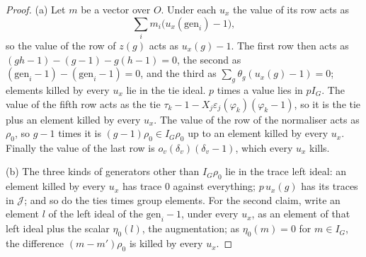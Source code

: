 \begin{proof}
(a) Let $m$ be a vector over $O$. Under each $u_x$ the value of its row acts as
\[
  \textstyle\sum_im_i\bigl(u_x(\mathrm{gen}_i)-1\bigr),
\]
so the value of the row of $z(g)$ acts as $u_x(g)-1$. The first row then acts as $(gh-1)-(g-1)-g(h-1)=0$, the second as
$(\mathrm{gen}_i-1)-(\mathrm{gen}_i-1)=0$, and the third as $\sum_g\theta_g(u_x(g)-1)=0$; elements killed by every $u_x$ lie in the tie ideal. $p$ times a value lies in $pI_G$. The value of the fifth row acts as the tie
$\tau_k-1-X_j\varepsilon_j(\varphi_k)(\varphi_k-1)$, so it is the tie plus an element killed by every $u_x$. The value of the row of the normaliser acts as $\rho_0$, so $g-1$ times it is $(g-1)\rho_0\in I_G\rho_0$ up to an element killed by every
$u_x$. Finally the value of the last row is $o_v(\delta_v)(\delta_v-1)$, which every $u_x$ kills.

(b) The three kinds of generators other than $I_G\rho_0$ lie in the trace left ideal: an element killed by every $u_x$ has trace $0$ against everything; $p\,u_x(g)$ has its traces in $\mathcal J$; and so do the ties times group elements.
For the second claim, write an element $l$ of the left ideal of the $\mathrm{gen}_i-1$, under every $u_x$, as an element of that left ideal plus the scalar $\eta_0(l)$, the augmentation; as $\eta_0(m)=0$ for $m\in I_G$, the difference
$(m-m')\rho_0$ is killed by every $u_x$.
\end{proof}

